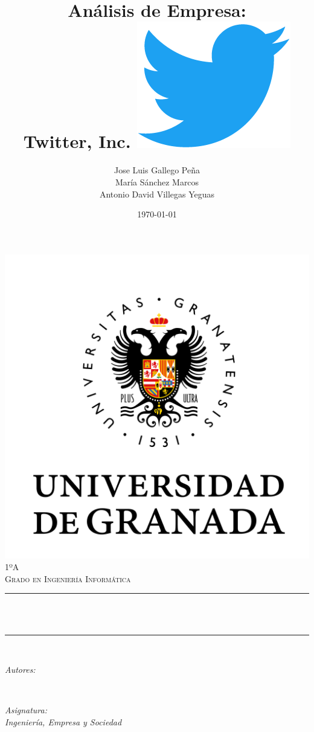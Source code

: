 \documentclass[12pt, spanish]{article}
\title{Análisis de Empresa:\\
Twitter, Inc. \includegraphics[scale = 0.05]{twitter_logo.png}  }
\author{Jose Luis Gallego Peña \\
María Sánchez Marcos \\
Antonio David Villegas Yeguas}
\date{\today}
\makeatletter
\let\thetitle\@title
\let\theauthor\@author
\let\thedate\@date
\makeatother
\begin{document}

\begin{titlepage}
    \centering
    \vspace*{0.5 cm}
    \includegraphics[scale = 0.50]{ugr.png}\\[1.0 cm]
    \textsc{\large 1ºA}\\[0.5 cm]            
    \textsc{\large Grado en Ingeniería Informática}\\[0.5 cm]              
    \rule{\linewidth}{0.2 mm} \\[0.4 cm]
    { \huge \bfseries \thetitle}\\
    \rule{\linewidth}{0.2 mm} \\[1.5 cm]
    
    \begin{minipage}{0.4\textwidth}
        \begin{flushleft} \large
            \emph{Autores:}\\
            \theauthor
            \end{flushleft}
            \end{minipage}~
            \begin{minipage}{0.4\textwidth}
            \begin{flushright} \large
            \emph{Asignatura: \\
            Ingeniería, Empresa y Sociedad}                   
        \end{flushright}
    \end{minipage}\\[1 cm]
  	
    {\large \thedate}\\[1 cm]
 	
    \vfill
    
\end{titlepage}
\end{document}
